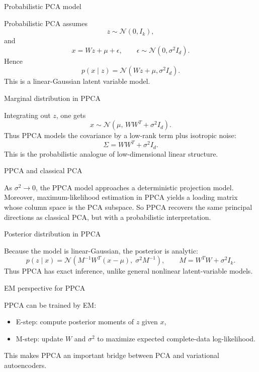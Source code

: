 \documentclass[aspectratio=169]{beamer}
\begin{document}
\begin{frame}{Probabilistic PCA model}

Probabilistic PCA assumes
\[
z \sim \mathcal{N}(0,I_k),
\]
and
\[
x = W z + \mu + \epsilon,
\qquad
\epsilon \sim \mathcal{N}(0,\sigma^2 I_d).
\]
Hence
\[
p(x\mid z)=\mathcal{N}(Wz+\mu,\sigma^2 I_d).
\]
This is a linear-Gaussian latent variable model.

\end{frame}

\begin{frame}{Marginal distribution in PPCA}

Integrating out \(z\), one gets
\[
x \sim \mathcal{N}(\mu,\, WW^T+\sigma^2 I_d).
\]
Thus PPCA models the covariance by a low-rank term plus isotropic noise:
\[
\Sigma = WW^T + \sigma^2 I_d.
\]
This is the probabilistic analogue of low-dimensional linear structure.

\end{frame}

\begin{frame}{PPCA and classical PCA}

As \(\sigma^2 \to 0\), the PPCA model approaches a deterministic projection model.
Moreover, maximum-likelihood estimation in PPCA yields a loading matrix whose column space is the PCA subspace.
So PPCA recovers the same principal directions as classical PCA, but with a probabilistic interpretation.

\end{frame}

\begin{frame}{Posterior distribution in PPCA}

Because the model is linear-Gaussian, the posterior is analytic:
\[
p(z\mid x)=\mathcal{N}(M^{-1}W^T(x-\mu),\;\sigma^2 M^{-1}),
\qquad
M=W^TW+\sigma^2 I_k.
\]
Thus PPCA has exact inference, unlike general nonlinear latent-variable models.

\end{frame}

\begin{frame}{EM perspective for PPCA}

PPCA can be trained by EM:
\begin{itemize}
\item E-step: compute posterior moments of \(z\) given \(x\),
\item M-step: update \(W\) and \(\sigma^2\) to maximize expected complete-data log-likelihood.
\end{itemize}
This makes PPCA an important bridge between PCA and variational autoencoders.

\end{frame}
\end{document}
